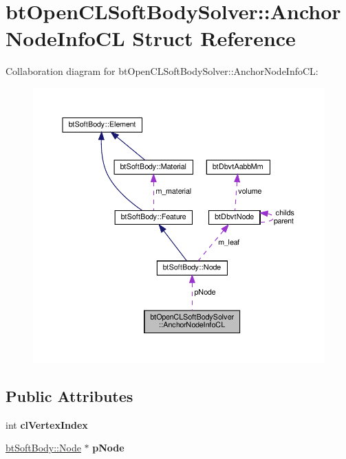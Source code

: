 \hypertarget{structbtOpenCLSoftBodySolver_1_1AnchorNodeInfoCL}{}\section{bt\+Open\+C\+L\+Soft\+Body\+Solver\+:\+:Anchor\+Node\+Info\+CL Struct Reference}
\label{structbtOpenCLSoftBodySolver_1_1AnchorNodeInfoCL}


Collaboration diagram for bt\+Open\+C\+L\+Soft\+Body\+Solver\+:\+:Anchor\+Node\+Info\+CL\+:
\nopagebreak
\begin{figure}[H]
\begin{center}
\leavevmode
\includegraphics[width=350pt]{structbtOpenCLSoftBodySolver_1_1AnchorNodeInfoCL__coll__graph}
\end{center}
\end{figure}
\subsection*{Public Attributes}
\begin{DoxyCompactItemize}
\item 
\mbox{\label{structbtOpenCLSoftBodySolver_1_1AnchorNodeInfoCL_a909d1b22b64cc35a3ccc083a587c6c71}} 
int {\bfseries cl\+Vertex\+Index}
\item 
\mbox{\label{structbtOpenCLSoftBodySolver_1_1AnchorNodeInfoCL_a3eb552181d01aeb29f3d07ed541512cc}} 
\hyperlink{structbtSoftBody_1_1Node}{bt\+Soft\+Body\+::\+Node} $\ast$ {\bfseries p\+Node}
\end{DoxyCompactItemize}


